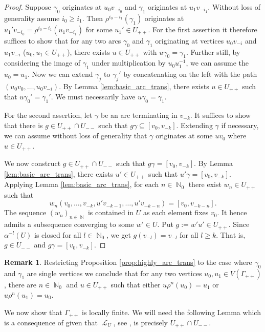 \documentclass{article}
\DeclareMathOperator\bbN{\mathbb{N}}
\DeclareMathOperator\calL{\mathcal{L}}
\theoremstyle{definition}
\newtheorem{remark}[theorem]{Remark}
\begin{document}
\begin{proof}
Suppose $\gamma_0$ originates at $u_0v_{-i_0}$ and $\gamma_1$ originates at $u_1v_{-i_1}$. Without loss of generality assume $i_0\ge i_1$. Then $\rho^{i_0 - i_1}(\gamma_1)$ originates at $u_1'v_{-i_0}=\rho^{i_0 - i_1}(u_1v_{-i_1})$ for some $u_{1}'\in U_{++}$. For the first assertion it therefore suffices to show that for any two arcs $\gamma_0$ and $\gamma_1$ originating at vertices $u_0v_{-i}$ and $u_1v_{-i}$ ($u_{0},u_{1}\in U_{++}$), there exists $u\in U_{++}$ with $u\gamma_0 = \gamma_1$. Further still, by considering the image of $\gamma_{1}$ under multiplication by $u_0u_1^{-1}$, we can assume the $u_0 = u_1$. Now we can extend $\gamma_j$ to $\gamma_j'$ by concatenating on the left with the path $(u_0v_0,\ldots, u_0v_{-i})$. By Lemma \ref{lem:basic_arc_trans}, there exists $u\in U_{++}$ such that $u\gamma_0' = \gamma_1'$. We must necessarily have $u\gamma_0 = \gamma_1$.

For the second assertion, let $\gamma$ be an arc terminating in $v_{-k}$. It suffices to show that there is $g\in U_{++}\cap U_{--}$ such that $g\gamma\subseteq[v_{0},v_{-k}]$. Extending $\gamma$ if necessary, we can assume without loss of generality that $\gamma$ originates at some $uv_0$ where $u\in U_{++}$.

We now construct $g\in U_{++}\cap U_{--}$ such that $g\gamma = [v_{0}, v_{-k}]$. By Lemma \ref{lem:basic_arc_trans}, there exists $u'\in U_{++}$ such that $u'\gamma = [v_0,v_{-k}]$. Applying Lemma \ref{lem:basic_arc_trans}, for each $n\in\bbN_{0}$ there exist $w_n\in U_{++}$ such that
\[w_n(v_0,\ldots, v_{-k},u'v_{-k - 1},\ldots, u'v_{-k-n}) = [v_{0},v_{-k-n}].\]
The sequence $(w_{n})_{n\in\bbN}$ is contained in $U$ as each element fixes $v_0$. It hence admits a subsequence converging to some $w'\in U$. Put $g:=w'u'\in U_{++}$. Since $\alpha^{-l}(U)$ is closed for all $l\in\bbN_{0}$, we get $g(v_{-l}) = v_{-l}$ for all $l\ge k$. That is, $g\in U_{--}$ and $g\gamma = [v_0,v_{-k}]$.
\end{proof}

\begin{remark}\label{rem:vertex_trans}
Restricting Proposition \ref{prop:highly_arc_trans} to the case where $\gamma_0$ and $\gamma_1$ are single vertices we conclude that for any two vertices $u_0,u_1\in V(\Gamma_{++})$, there are $n\in\bbN_{0}$ and $u\in U_{++}$ such that either $u\rho^{n}(u_0) = u_1$ or $u\rho^{n}(u_1) = u_0$.
\end{remark}

We now show that $\Gamma_{++}$ is locally finite. We will need the following Lemma which is a consequence of \cite[Proposition 4]{Wil15} given that $\calL_{U}$, see \cite[Definition 5]{Wil15}, is precisely $U_{++}\cap U_{--}$.
\end{document}
